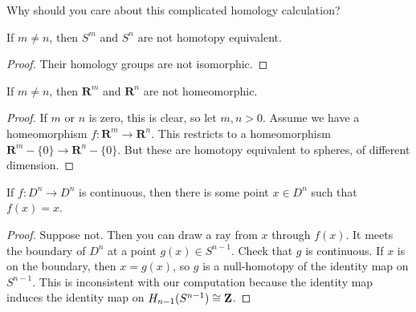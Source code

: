 Why should you care about this complicated homology calculation?
\begin{corollary}
If $m\neq n$, then $S^m$ and $S^n$ are not homotopy equivalent.
\end{corollary}
\begin{proof}
Their homology groups are not isomorphic.
\end{proof}
\begin{corollary}
If $m\neq n$, then $\mathbf{R}^m$ and $\mathbf{R}^n$ are not homeomorphic.
\end{corollary}
\begin{proof}
If $m$ or $n$ is zero, this is clear, so 
let $m,n>0$. Assume we have a homeomorphism $f:\mathbf{R}^m\to \mathbf{R}^n$. This restricts to a homeomorphism $\mathbf{R}^m-\{0\}\to \mathbf{R}^n-\{0\}$.
But these are homotopy equivalent to spheres, of different dimension.
\end{proof}
\begin{theorem}
If $f:D^n\to D^n$ is continuous, 
then there is some point $x\in D^n$ such that $f(x)=x$.
\end{theorem}
\begin{proof}
Suppose not. Then you can draw a ray from $x$ through $f(x)$. It meets the boundary of $D^n$ at a point $g(x)\in S^{n-1}$. Check that $g$ is continuous. If $x$ is on the boundary, then $x=g(x)$, so $g$ is a null-homotopy of the identity map on $S^{n-1}$. This is inconsistent with our computation because the identity map induces the identity map on $ H_{n-1}(S^{n-1})\cong\mathbf Z$.
\end{proof}



